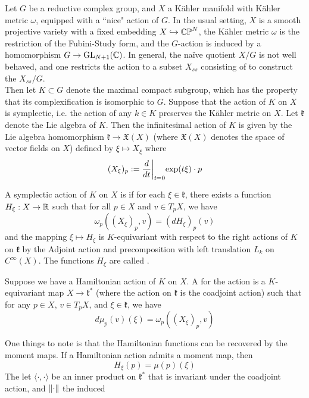 Let $G$ be a reductive complex group, and $X$ a K\"ahler manifold with K\"ahler
metric $\omega$, equipped with a ``nice" action of $G$. In the usual setting,
$X$ is a smooth projective variety with a fixed embedding $X \hookrightarrow \mathbb{CP}^N$,
the K\"ahler metric $\omega$ is the restriction of the Fubini-Study form,
and the $G$-action is induced by a homomorphism $G \to \mathrm{GL}_{N+1}(\mathbb{C})$. In general,
the na\"ive quotient $X/G$ is not well behaved, and one restricts the action to a
subset $X_{ss}$ consisting of  to construct the
 $X_{ss}/G$. \\

Then let $K \subset G$ denote the maximal compact subgroup, which has the
property that its complexification is isomorphic to $G$. Suppose that
the action of $K$ on $X$ is symplectic, i.e. the action of any $k \in K$
preserves the K\"ahler metric on $X$. Let $\mathfrak{k}$ denote the
Lie algebra of $K$. Then the infinitesimal action of $K$ is given by
the Lie algebra homomorphism $\mathfrak{k} \to \mathfrak{X}(X)$ (where
$\mathfrak{X}(X)$ denotes the space of vector fields on $X$) defined by
$\xi \mapsto X_\xi$ where
\[
(X_\xi)_p \vcentcolon= \frac{d}{dt}\bigg\vert_{t=0}\mathrm{exp}(t\xi)\cdot p
\]
\begin{defn}
A symplectic action of $K$ on $X$ is  if for each
$\xi \in \mathfrak{k}$, there exists a function $H_\xi : X \to \mathbb{R}$
such that for all $p \in X$ and $v \in T_pX$, we have
\[
\omega_p((X_\xi)_p,v) = (dH_\xi)_p(v)
\]
and the mapping $\xi \mapsto H_\xi$ is $K$-equivariant with respect
to the right actions of $K$ on $\mathfrak{k}$ by the Adjoint action
and precomposition with left translation $L_k$ on $C^\infty(X)$. The
functions $H_\xi$ are called .
\end{defn}
%
\begin{defn}
Suppose we have a Hamiltonian action of $K$ on $X$. A 
for the action is a $K$-equivariant map $X \to \mathfrak{k}^*$ (where the
action on $\mathfrak{k}$ is the coadjoint action) such
that for any $p \in X$, $v \in T_pX$, and $\xi \in \mathfrak{k}$, we have
\[
d\mu_p(v)(\xi) = \omega_p((X_\xi)_p,v)
\]
\end{defn}
%
One things to note is that the Hamiltonian functions can be
recovered by the moment maps. If a Hamiltonian action admits a moment map,
then
\[
H_\xi(p) = \mu(p)(\xi)
\]
The let $\langle\cdot,\cdot\rangle$ be an inner product on $\mathfrak{k}^*$
that is invariant under the coadjoint action, and $\left\lVert\cdot\right\rVert$ the induced
